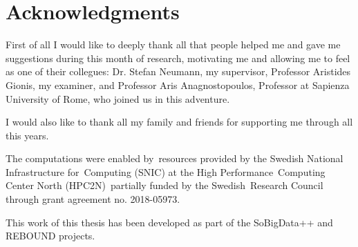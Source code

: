 \section*{Acknowledgments }

First of all I would like to deeply thank all that people helped me and gave me
suggestions during this month of research, motivating me and allowing me to
feel as one of their collegues: Dr. Stefan Neumann, my supervisor, Professor
Aristides Gionis, my examiner, and Professor Aris Anagnostopoulos, Professor at
Sapienza University of Rome, who joined us in this adventure.

I would also like to thank all my family and friends for supporting me through
all this years.

The computations were enabled by resources provided by the Swedish National Infrastructure for Computing
(SNIC) at the High Performance Computing Center North (HPC2N) partially funded by the Swedish Research Council through grant agreement no. 2018-05973.

This work of this thesis has been developed as part of the SoBigData++ and
REBOUND projects.
\acknowlegmentssignature

